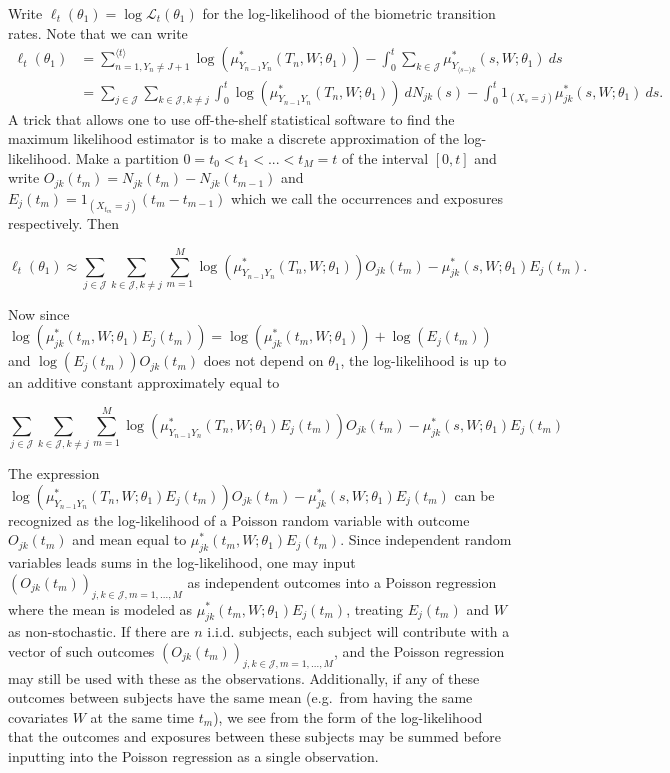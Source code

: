 \documentclass[a4paper,10pt,openany]{book}
\begin{document}
Write \(\ell_t(\theta_1) = \log\mathcal L_t(\theta_1)\) for the log-likelihood of the biometric transition rates. Note that we can write
\begin{align*}
\ell_t(\theta_1)&= \sum_{n=1,Y_n\ne J+1}^{\langle t\rangle}  \log\left(\mu^*_{Y_{n-1}Y_n}(T_n,W;\theta_1)\right)-\int_0^t  \sum_{k\in\mathcal J}\mu^*_{Y_{\langle s-\rangle k}}(s,W;\theta_1)\ ds\\
&=\sum_{j\in \mathcal J}\sum_{k\in \mathcal J, k\ne j}\int_0^t\log\left(\mu^*_{Y_{n-1}Y_n}(T_n,W;\theta_1)\right)\ dN_{jk}(s)-\int_0^t 1_{(X_s=j)}\mu^*_{jk}(s,W;\theta_1)\ ds.
\end{align*}
A trick that allows one to use off-the-shelf statistical software to find the maximum likelihood estimator is to make a discrete approximation of the log-likelihood. Make a partition \(0 = t_0 < t_1 < ... < t_M = t\) of the interval \([0,t]\) and write \(O_{jk}(t_m) = N_{jk}(t_m) − N_{jk}(t_{m−1})\) and \(E_j(t_m) = 1_{(X_{t_m} =j)}(t_m − t_{m−1})\) which we call the occurrences and exposures respectively. Then

\[
\ell_t(\theta_1)\approx \sum_{j\in \mathcal J}\sum_{k\in \mathcal J, k\ne j}\sum_{m=1}^M\log\left(\mu^*_{Y_{n-1}Y_n}(T_n,W;\theta_1)\right)O_{jk}(t_m)-\mu^*_{jk}(s,W;\theta_1)E_j(t_m).
\]

Now since \(\log(\mu^*_{jk}(t_m,W;\theta_1)E_j(t_m)) = \log(\mu^*_{jk}(t_m,W;\theta_1))+\log(E_j(t_m))\) and \(\log(E_j(t_m))O_{jk}(t_m)\) does not depend on \(\theta_1\), the log-likelihood is up to an additive constant approximately equal to

\[
\sum_{j\in \mathcal J}\sum_{k\in \mathcal J, k\ne j}\sum_{m=1}^M\log\left(\mu^*_{Y_{n-1}Y_n}(T_n,W;\theta_1)E_j(t_m)\right)O_{jk}(t_m)-\mu^*_{jk}(s,W;\theta_1)E_j(t_m)
\]

The expression \(\log\left(\mu^*_{Y_{n-1}Y_n}(T_n,W;\theta_1)E_j(t_m)\right)O_{jk}(t_m)-\mu^*_{jk}(s,W;\theta_1)E_j(t_m)\) can be recognized as the log-likelihood of a Poisson random variable with outcome \(O_{jk}(t_m)\) and mean equal to \(\mu^*_{jk}(t_m,W;\theta_1)E_j(t_m)\). Since independent random variables leads sums in the log-likelihood, one may input \((O_{jk}(t_m))_{j,k\in\mathcal J,m=1,...,M}\) as independent outcomes into a Poisson regression where the mean is modeled as \(\mu^*_{jk}(t_m,W;\theta_1)E_j(t_m)\), treating \(E_j(t_m)\) and \(W\) as non-stochastic. If there are \(n\) i.i.d. subjects, each subject will contribute with a vector of such outcomes \((O_{jk}(t_m))_{j,k\in\mathcal J,m=1,...,M}\), and the Poisson regression may still be used with these as the observations. Additionally, if any of these outcomes between subjects have the same mean (e.g.~from having the same covariates \(W\) at the same time \(t_m\)), we see from the form of the log-likelihood that the outcomes and exposures between these subjects may be summed before inputting into the Poisson regression as a single observation.
\end{document}
